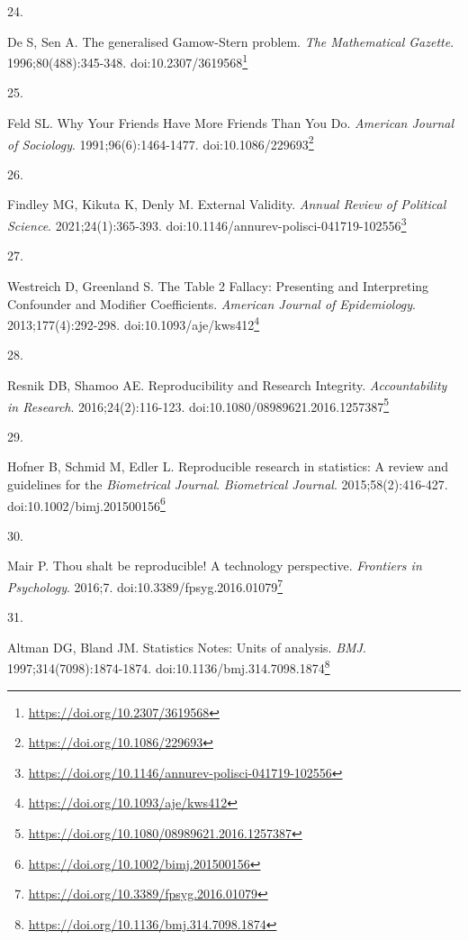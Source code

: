 \documentclass[
  a4paper,
]{book}
\newlength{\cslhangindent}
\newlength{\csllabelwidth}
\newlength{\cslentryspacingunit} %
\newenvironment{CSLReferences}[2] %
 {%
  \setlength{\parindent}{0pt}
  \ifodd #1
  \let\oldpar\par
  \def\par{\hangindent=\cslhangindent\oldpar}
  \fi
  \setlength{\parskip}{#2\cslentryspacingunit}
 }%
 {}
\newcommand{\CSLLeftMargin}[1]{\parbox[t]{\csllabelwidth}{#1}}
\newcommand{\CSLRightInline}[1]{\parbox[t]{\linewidth - \csllabelwidth}{#1}\break}
\renewcommand{\href}[2]{#2\footnote{\url{#1}}}
\begin{document}
\begin{CSLReferences}{0}{0}
\leavevmode{}%
\CSLLeftMargin{24. }%
\CSLRightInline{De S, Sen A. The generalised Gamow-Stern problem. \emph{The Mathematical Gazette}. 1996;80(488):345-348. doi:\href{https://doi.org/10.2307/3619568}{10.2307/3619568}}

\leavevmode{}%
\CSLLeftMargin{25. }%
\CSLRightInline{Feld SL. Why Your Friends Have More Friends Than You Do. \emph{American Journal of Sociology}. 1991;96(6):1464-1477. doi:\href{https://doi.org/10.1086/229693}{10.1086/229693}}

\leavevmode{}%
\CSLLeftMargin{26. }%
\CSLRightInline{Findley MG, Kikuta K, Denly M. External Validity. \emph{Annual Review of Political Science}. 2021;24(1):365-393. doi:\href{https://doi.org/10.1146/annurev-polisci-041719-102556}{10.1146/annurev-polisci-041719-102556}}

\leavevmode{}%
\CSLLeftMargin{27. }%
\CSLRightInline{Westreich D, Greenland S. The Table 2 Fallacy: Presenting and Interpreting Confounder and Modifier Coefficients. \emph{American Journal of Epidemiology}. 2013;177(4):292-298. doi:\href{https://doi.org/10.1093/aje/kws412}{10.1093/aje/kws412}}

\leavevmode{}%
\CSLLeftMargin{28. }%
\CSLRightInline{Resnik DB, Shamoo AE. Reproducibility and Research Integrity. \emph{Accountability in Research}. 2016;24(2):116-123. doi:\href{https://doi.org/10.1080/08989621.2016.1257387}{10.1080/08989621.2016.1257387}}

\leavevmode{}%
\CSLLeftMargin{29. }%
\CSLRightInline{Hofner B, Schmid M, Edler L. Reproducible research in statistics: A review and guidelines for the {\emph{Biometrical Journal}}. \emph{Biometrical Journal}. 2015;58(2):416-427. doi:\href{https://doi.org/10.1002/bimj.201500156}{10.1002/bimj.201500156}}

\leavevmode{}%
\CSLLeftMargin{30. }%
\CSLRightInline{Mair P. Thou shalt be reproducible! A technology perspective. \emph{Frontiers in Psychology}. 2016;7. doi:\href{https://doi.org/10.3389/fpsyg.2016.01079}{10.3389/fpsyg.2016.01079}}

\leavevmode{}%
\CSLLeftMargin{31. }%
\CSLRightInline{Altman DG, Bland JM. Statistics Notes: Units of analysis. \emph{BMJ}. 1997;314(7098):1874-1874. doi:\href{https://doi.org/10.1136/bmj.314.7098.1874}{10.1136/bmj.314.7098.1874}}


\end{CSLReferences}
\end{document}
